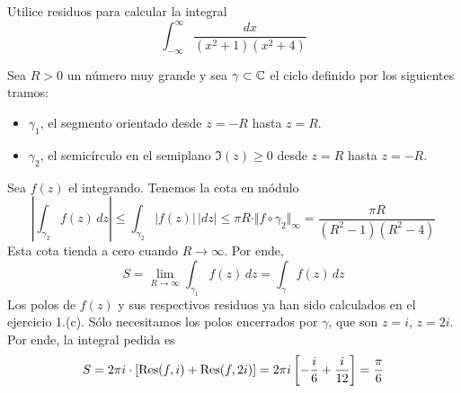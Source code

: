 \begin{exercise}
Utilice residuos para calcular la integral
$$\int_{-\infty}^\infty \frac {dx} {(x^2 + 1) (x^2 + 4)}$$
\end{exercise}

\begin{solution}
Sea $R > 0$ un número muy grande y sea $\gamma \subset \mathbb C$ el ciclo definido por los siguientes tramos:
\begin{itemize}
    \item $\gamma_1$, el segmento orientado desde $z = -R$ hasta $z = R$.
    \item $\gamma_2$, el semicírculo en el semiplano $\Im(z) \ge 0$ desde $z = R$ hasta $z = -R$.
\end{itemize}
Sea $f(z)$ el integrando. Tenemos la cota en módulo
$$
\left| \int_{\gamma_2} f(z) \, dz \right|
    \le \int_{\gamma_2} \left| f(z) \right| \, |dz|
    \le \pi R \cdot \Vert f \circ \gamma_2 \Vert_\infty
    = \frac {\pi R} {(R^2 - 1) (R^2 - 4)}
$$
Esta cota tienda a cero cuando $R \to \infty$. Por ende,
$$S = \lim_{R \to \infty} \int_{\gamma_1} f(z) \, dz = \int_\gamma f(z) \, dz$$
Los polos de $f(z)$ y sus respectivos residuos ya han sido calculados en el ejercicio 1.(c). Sólo necesitamos los polos encerrados por $\gamma$, que son $z = i$, $z = 2i$. Por ende, la integral pedida es
$$S = 2\pi i \cdot [\operatorname{Res}(f, i) + \operatorname{Res}(f, 2i)] = 2\pi i \left[ -\frac i6 + \frac i {12} \right] = \frac \pi 6$$
\end{solution}
